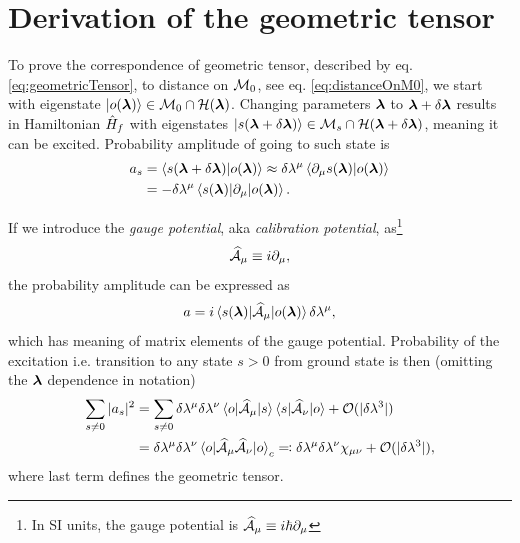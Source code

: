 \section{Derivation of the geometric tensor}
\label{sec:derivationOfGeometricTensor}
To prove the correspondence of geometric tensor, described by eq. \ref{eq:geometricTensor}, to distance on $\M_0$, see eq. \ref{eq:distanceOnM0}, we start with eigenstate $\ket{o(\llambda)}\in \M_0\cap \H(\llambda)$. Changing parameters $\llambda$ to $\llambda+\delta \llambda$ results in Hamiltonian $\HH_f$ with eigenstates $\ket{s(\llambda+\delta \llambda)}\in \M_s\cap\H(\llambda+\delta \llambda)$, meaning it can be excited. Probability amplitude of going to such state is
\begin{equation}
    \begin{split}
        a_s&=\braket{s(\llambda+\delta\llambda)|o(\llambda)}\approx \delta\lambda^\mu\braket{\partial_\mu s(\llambda)|o(\llambda)} \\
        &= -\delta\lambda^\mu\braket{s(\llambda)|\partial_\mu|o(\llambda)}.
    \end{split}
\end{equation}

If we introduce the \emph{gauge potential}, aka \emph{calibration potential}, as\footnote{In SI units, the gauge potential is $\AA_\mu\equiv i\hbar\partial_{\mu}$}
\begin{equation}
    \AA_\mu\equiv i\partial_{\mu},
\end{equation}
the probability amplitude can be expressed as
\begin{equation}
   a=i\braket{s(\llambda)|\AA_\mu |o(\llambda)}\delta\lambda^\mu,
   \label{eq:probabilityOfTransitionIsGauge}
\end{equation}
which has meaning of matrix elements of the gauge potential. Probability of the excitation i.e. transition to any state $s>0$ from ground state is then (omitting the $\llambda$ dependence in notation)
\begin{equation}
    \begin{split}
        \sum_{s\neq 0}|a_s|^2&=  \sum_{s\neq 0} \delta \lambda^\mu \delta \lambda^\nu\braket{o|\AA_\mu|s}\braket{s|\AA_\nu|o}+\O(|\delta \lambda^3|) \\
        &= \delta \lambda^\mu \delta \lambda^\nu\braket{o|\AA_\mu \AA_\nu|o}_c\eqqcolon \delta \lambda^\mu \delta \lambda^\nu\chi_{\mu\nu}+\O(|\delta \lambda^3|),
    \end{split}
\end{equation}
where last term defines the geometric tensor.

